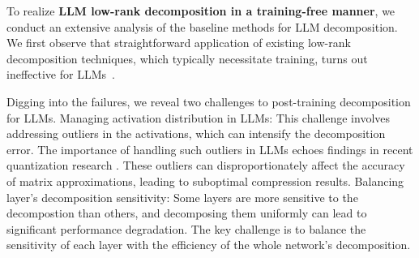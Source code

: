 To realize \textbf{LLM low-rank decomposition in a training-free manner}, we conduct an extensive analysis of the baseline methods for LLM decomposition. 
We first observe that straightforward application of existing low-rank decomposition techniques, which typically necessitate training, turns out ineffective for LLMs~\citep{denton2014exploiting,lebedev2014speeding,sainath2013low,moczulski2015acdc,jaderberg2014speeding,khodak2021initialization,wang2021pufferfish}. 


Digging into the failures, we reveal two challenges to post-training decomposition for LLMs. \raisebox{-1.1pt}{\ding[1.1]{182\relax}} Managing activation distribution in LLMs: This challenge involves addressing outliers in the activations, which can intensify the decomposition error. The importance of handling such outliers in LLMs echoes findings in recent quantization research \citep{lin2023awq,kim2023squeezellm}. These outliers can disproportionately affect the accuracy of matrix approximations, leading to suboptimal compression results.
\raisebox{-1.1pt}{\ding[1.1]{183\relax}} Balancing layer's decomposition sensitivity: Some layers are more sensitive to the decompostion than others, and decomposing them uniformly can lead to significant performance degradation. The key challenge is to balance the sensitivity of each layer with the efficiency of the whole network's decomposition.


